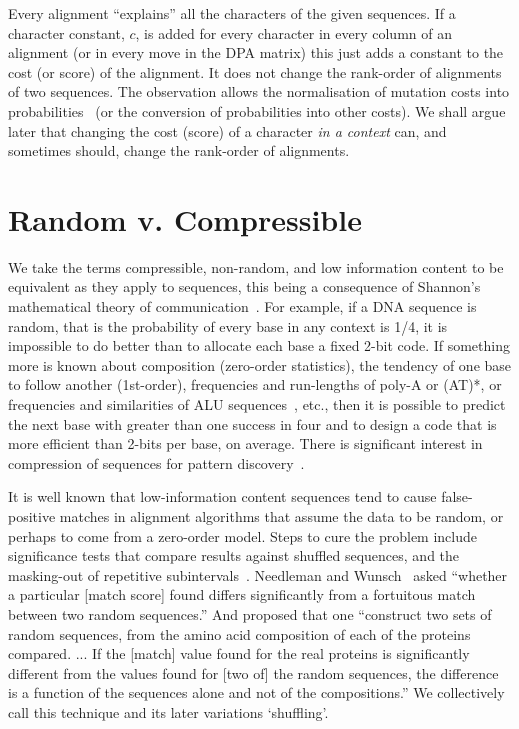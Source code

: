 \documentclass[letterpaper,11pt,oneside]{article}
\begin{document}
Every alignment ``explains'' all the characters of the given sequences.
If a character constant, $c$, is added for every character
in every column of an alignment (or in every move in the DPA matrix)
this just adds a constant to the cost (or score) of the alignment.
It does not change the rank-order of alignments of two sequences.
The observation allows the normalisation of mutation costs into
probabilities~\cite{allison93a} (or the conversion of probabilities into other costs).
We shall argue later that changing the cost (score) of a character
{\em in a context} can, and sometimes should, change the rank-order
of alignments.


\section{Random v. Compressible}

We take the terms compressible, non-random, and low information content
to be equivalent as they apply to sequences, this being a consequence of
Shannon's mathematical theory of communication~\cite{shannon48}.
For example, if a DNA sequence is random, that is the probability of every
base in any context is 1/4, it is impossible to do better than to allocate
each base a fixed 2-bit code.
If something more is known about composition (zero-order statistics),
the tendency of one base to follow another (1st-order),
frequencies and run-lengths of poly-A or (AT)*, or
frequencies and similarities of ALU sequences~\cite{herzel94}, etc.,
then it is possible to predict the next base with greater than one success
in four and to design a code that is more efficient than 2-bits per base,
on average.  There is significant interest in compression of sequences for
pattern discovery~\cite{grumbach94, loewenstern97, rivals97, allison00a, stern01}.

It is well known that low-information content sequences tend to cause
false-positive matches in alignment algorithms that assume
the data to be random, or perhaps to come from a zero-order model.
Steps to cure the problem include
significance tests that compare results against shuffled sequences, and
the masking-out of repetitive subintervals~\cite{wootton93}.
Needleman and Wunsch~\cite{needleman70}
asked ``whether a particular [match score] found differs significantly
from a fortuitous match between two random sequences.''
And proposed that one ``construct two sets of random sequences,
from the amino acid composition of each of the proteins compared. ...
If the [match] value found for the real proteins is significantly different
from the values found for [two of] the random sequences,
the difference is a function of the sequences alone and
not of the compositions.''
We collectively call this technique and its later variations `shuffling'.
\end{document}
